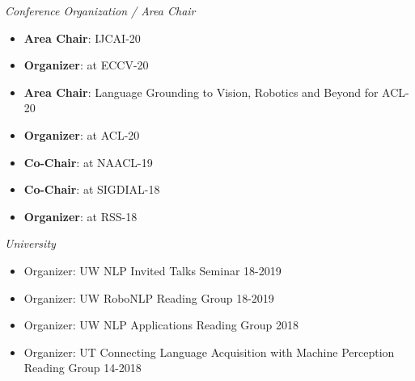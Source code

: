 \documentclass{res}
\newcommand{\citehref}[2]{\href{#1}{\color{darkblue}{#2}}}
\begin{document}
\begin{resume}
{\sl Conference Organization / Area Chair}
  \begin{itemize}
    \item \textbf{Area Chair}: IJCAI-20
    \item \textbf{Organizer}: \citehref{https://askforalfred.com/EVAL/}{Embodied Vision, Actions \& Language Workshop (EVAL)} at ECCV-20
    \item \textbf{Area Chair}: Language Grounding to Vision, Robotics and Beyond for ACL-20
    \item \textbf{Organizer}: \citehref{https://alvr-workshop.github.io/}{First Workshop on Advances in Language and Vision Research (ALVR)} at ACL-20
    \item \textbf{Co-Chair}: \citehref{https://splu-robonlp.github.io/}{Combined Workshop on Spatial Language Understanding (SpLU) and Grounded Communication for Robotics (RoboNLP)} at NAACL-19
    \item \textbf{Co-Chair}: \citehref{https://robodial.github.io/}{Special Session on Physically Situated Dialog (RoboDIAL)} at SIGDIAL-18
    \item \textbf{Organizer}: \citehref{http://www2.ece.rochester.edu/projects/rail/mrhrc2018/}{Workshop on Communicating with Robots Naturally (CWRN)} at RSS-18
  \end{itemize}

{\sl University}
\begin{itemize}
    \item Organizer: UW NLP Invited Talks Seminar \hfill 18-2019
    \item Organizer: UW RoboNLP Reading Group \hfill 18-2019
    \item Organizer: UW NLP Applications Reading Group \hfill 2018
    \item Organizer: UT Connecting Language Acquisition with Machine Perception Reading Group \hfill 14-2018
  \end{itemize}


\end{resume}
\end{document}
